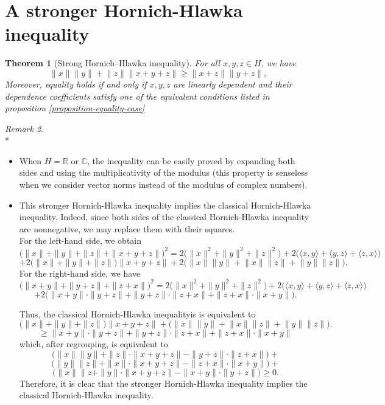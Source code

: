 \documentclass[a4paper,10pt]{article}
\theoremstyle{plain}
\newtheorem{theorem}{Theorem}[section]
\theoremstyle{definition}
\theoremstyle{remark}
\newtheorem{remark}[theorem]{Remark}
\begin{document}
\section{A stronger Hornich-Hlawka inequality}
\label{section-2}

\begin{theorem}[Strong Hornich–Hlawka inequality]
For all $x,y,z \in H$, we have
\[ \lVert x \rVert \lVert y \rVert + \lVert z \rVert \lVert x+y+z \rVert \geq \lVert x + z \rVert \lVert y + z \rVert, \]
Moreover, equality holds if and only if $x,y,z$ are linearly dependent and their dependence coefficients satisfy one of the equivalent conditions listed in proposition \ref{proposition-equality-case}
\end{theorem}

\begin{remark} \mbox{}\\*
\begin{itemize}
\item When $H = \mathbb{R}$ or $\mathbb{C}$, the inequality can be easily proved by expanding both sides and using the multiplicativity of the modulus (this property is senseless when we consider vector norms instead of the modulus of complex numbers).
\item This stronger Hornich-Hlawka inequality implies the classical Hornich-Hlawka inequality. Indeed, since both sides of the classical Hornich-Hlawka inequality are nonnegative, we may replace them with their squares. \\
For the left-hand side, we obtain
\[
\bigl( \|x\| + \|y\| + \|z\| + \|x + y + z\| \bigr)^2 = 2\bigl(\|x\|^2 + \|y\|^2 + \|z\|^2\bigr) + 2\bigl(\langle x,y\rangle + \langle y,z\rangle + \langle z,x\rangle\bigr)
\]
\[
+ 2\bigl( \|x\| + \|y\| + \|z\| \bigr) \|x + y + z\| + 2\bigl( \lVert x \rVert \lVert y \rVert + \lVert x \rVert \lVert z \rVert + \lVert y \rVert \lVert z \rVert \bigr).
\]
For the right-hand side, we have
\[
\bigl( \|x + y\| + \|y + z\| + \|z + x\| \bigr)^2 = 2\bigl(\|x\|^2 + \|y\|^2 + \|z\|^2\bigr) + 2\bigl(\langle x,y\rangle + \langle y,z\rangle + \langle z,x\rangle\bigr)
\]
\[
+ 2\bigl( \|x + y\| \cdot \|y + z\| + \|y + z\| \cdot \|z + x\| + \|z + x\| \cdot \|x + y\| \bigr).
\]

Thus, the classical Hornich-Hlawka inequalityis is equivalent to
\[
\bigl( \|x\| + \|y\| + \|z\| \bigr) \|x + y + z\| + \bigl( \lVert x \rVert \lVert y \rVert +  \lVert x \rVert \lVert z  \rVert + \lVert y \rVert \lVert z \rVert \bigr).
\]
\[
\geq \|x + y\| \cdot \|y + z\| + \|y + z\| \cdot \|z + x\| + \|z + x\| \cdot \|x + y\|
\]
which, after regrouping, is equivalent to
\[
\bigl( \lVert x \rVert \lVert y \rVert  + \|z\| \cdot \|x + y + z\| - \|y + z\| \cdot \|z + x\| \bigr) +
\]
\[
\bigl( \lVert y \rVert \lVert z \rVert + \|x\| \cdot \|x + y + z\| - \|z + x\| \cdot \|x + y\| \bigr) +
\]
\[
\bigl( \lVert x \rVert \lVert z  + \|y\| \cdot \|x + y + z\| - \|x + y\| \cdot \|y + z\| \bigr) \geq 0.
\]
Therefore, it is clear that the stronger Hornich-Hlawka inequality implies the classical Hornich-Hlawka inequality.
\end{itemize}
\end{remark}
\end{document}
